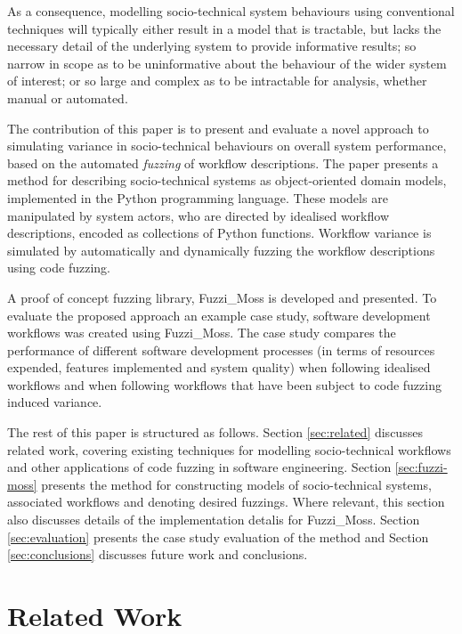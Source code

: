\documentclass{sig-alternate}
\begin{document}
As a consequence, modelling socio-technical system behaviours using conventional
techniques will typically either result in a model that is tractable, but lacks
the necessary detail of the underlying system to provide informative results; so
narrow in scope as to be uninformative about the behaviour of the wider system
of interest; or so large and complex as to be intractable for analysis, whether
manual or automated.

The contribution of this paper is to present and evaluate a novel approach to
simulating variance in socio-technical behaviours on overall system performance,
based on the automated \emph{fuzzing} of workflow descriptions.  The paper
presents a method for describing socio-technical systems as object-oriented
domain models, implemented in the Python programming language.  These models are
manipulated by system actors, who are directed by idealised workflow
descriptions, encoded as collections of Python functions.  Workflow variance is
simulated by automatically and dynamically fuzzing the workflow descriptions
using code fuzzing.

A proof of concept fuzzing library, Fuzzi\_Moss is developed and presented.  To
evaluate the proposed approach an example case study, software development
workflows was created using Fuzzi\_Moss.  The case study compares the
performance of different software development processes (in terms of resources
expended, features implemented and system quality) when following idealised
workflows and when following workflows that have been subject to code fuzzing
induced variance.

The rest of this paper is structured as follows.  Section \ref{sec:related}
discusses related work, covering existing techniques for modelling
socio-technical workflows and other applications of code fuzzing in software
engineering.  Section \ref{sec:fuzzi-moss} presents the method for constructing
models of socio-technical systems, associated workflows and denoting desired
fuzzings.  Where relevant, this section also discusses details of the
implementation detalis for Fuzzi\_Moss.  Section \ref{sec:evaluation} presents
the case study evaluation of the method and Section \ref{sec:conclusions}
discusses future work and conclusions.


\section{Related Work}
\end{document}
